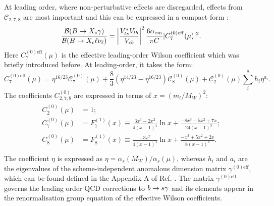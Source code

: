 At leading order, where non-perturbative effects are disregarded, effects from $\mathcal{C}_{2,7,8}$ are most important and this can be expressed in a compact form \cite{Buras:1993xp}:
\begin{equation}\label{eq:total_decay_rate_leading_order}
    \frac{\mathcal{B}(\BtoXsgamma)}{\mathcal{B}(\B\to X_c\ell\nu_\ell)} = \left|\frac{V_{ts}^*V_{tb}}{V_{cb}}\right|^2\frac{6\alpha_{\mathrm{em}}}{\pi C}|C_{7}^{(0)\mathrm{eff}}(\mu)|^2.
\end{equation}
Here $C_{7}^{(0)\mathrm{eff}}(\mu)$ is the effective leading-order Wilson coefficient which was briefly introduced before.
At leading-order, it takes the form:
\begin{equation}\label{eq:effective_c7}
    C_{7}^{(0)\mathrm{eff}}(\mu) = \eta^{16/23}\mathcal{C}^{(0)}_7(\mu) + \frac{8}{3} \left(\eta^{14/23}-\eta^{16/23}\right)\mathcal{C}^{(0)}_8(\mu) + \mathcal{C}^{(0)}_2(\mu) \sum_i^8h_i\eta^{a_i}.
\end{equation}
The \SM coefficients $C_{2,7,8}^{(0)}$ are expressed in terms of $x=(m_t/M_W)^2$:
\begin{align}\label{eq:leading_order_wilson_coeffs}
    \begin{split}
    C_2^{(0)}(\mu) &= 1;\\
    C_7^{(0)}(\mu) &= F_7^{(1)}(x) \equiv \frac{3x^3-2x^2}{4(x-1)^4}\ln x + \frac{-8x^3-5x^2+7x}{24(x-1)^3};\\
    C_8^{(0)}(\mu) &= F_8^{(1)}(x) \equiv \frac{-3x^2}{4(x-1)^4}\ln x + \frac{-x^3+5x^2+2x}{8(x-1)^3}.\\
    \end{split}
\end{align}
The coefficient $\eta$ is expressed as $\eta=\alpha_s(M_W)/\alpha_s(\mu)$, whereas $h_i$ and $a_i$ are the eigenvalues of the scheme-independent anomalous dimension matrix $\gamma^{(0)\mathrm{eff}}$, which can be found defined in the Appendix A of Ref. \cite{Buras:1993xp}.
The matrix $\gamma^{(0)\mathrm{eff}}$ governs the leading order QCD corrections to $b\rightarrow s\gamma$ and its elements appear in the renormalisation group equation of the effective Wilson coefficients.

